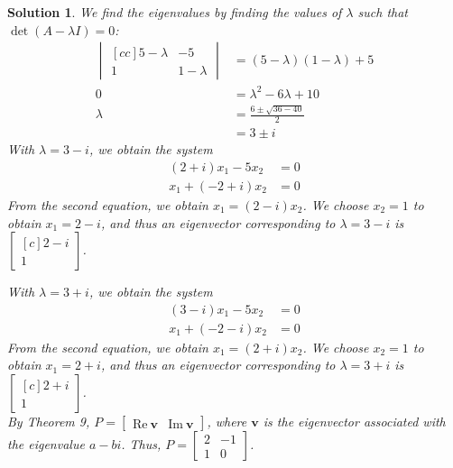 \documentclass[11pt]{scrartcl}
\theoremstyle{dotlessP}
\newtheorem{sol}{Solution}[section]
\theoremstyle{dotlessN}
\begin{document}
\begin{sol}
	We find the eigenvalues by finding the values of $\lambda$ such that $\det(A - \lambda I) = 0$:
	\begin{align*}
		\begin{vmatrix}[cc]
			5 - \lambda & -5 \\
			1 & 1 - \lambda
		\end{vmatrix} &= (5-\lambda)(1- \lambda) + 5 \\
		0 & = \lambda^2 - 6 \lambda + 10\\
		\lambda &= 
		\frac{6 \pm \sqrt{36 - 40}}{2} \\
				&= 3 \pm i
	\end{align*}
	With $\lambda = 3 - i$, we obtain the system
	\begin{align*}
		(2+i)x_1 -5x_2 &= 0 \\
		x_1 + (-2+i)x_2 &= 0
	\end{align*}
	From the second equation, we obtain $x_1 = (2-i)x_2$. We choose  $x_2 = 1$ to obtain $x_1 = 2 - i$, and thus an eigenvector corresponding to $\lambda = 3 - i$ is
	$	\begin{bmatrix}[c]
		2 - i \\
		1
	\end{bmatrix}$.

	With $\lambda = 3 + i$, we obtain the system
	\begin{align*}
		(3 - i)x_1 - 5x_2 &= 0 \\
		x_1 + (-2 -i)x_2 &= 0
	\end{align*}
	From the second equation, we obtain $x_1 = (2 + i)x_2$. We choose $x_2 = 1$ to obtain $x_1 = 2 + i$, and thus an eigenvector corresponding to $\lambda = 3 + i$ is  $
	\begin{bmatrix}[c]
	2 + i \\
	1
\end{bmatrix}
	$.
	\\

	By Theorem 9, $P = 
\begin{bmatrix}
	\text{Re} \ \bm{v} & \text{Im}\ \bm{v}	
\end{bmatrix}
$, where $\bm{v}$ is the eigenvector associated with the eigenvalue $a - bi$. Thus, $P =
\begin{bmatrix}
	2 & -1 \\
	1 & 0
\end{bmatrix}$.
\end{sol}
\end{document}
